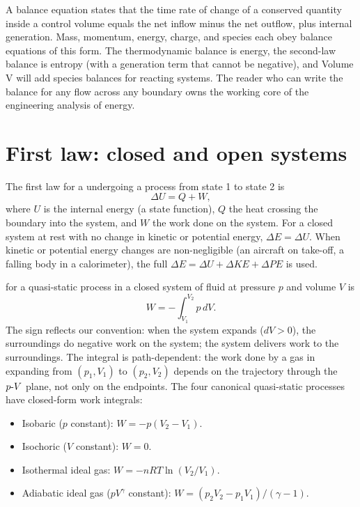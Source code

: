 \begin{archetype}[Balance]
A balance equation states that the time rate of change of a conserved
quantity inside a control volume equals the net inflow minus the net
outflow, plus internal generation. Mass, momentum, energy, charge, and
species each obey balance equations of this form. The thermodynamic
balance is energy, the second-law balance is entropy (with a
generation term that cannot be negative), and Volume V will add
species balances for reacting systems. The reader who can write the
balance for any flow across any boundary owns the working core of the
engineering analysis of energy.
\end{archetype}

\section{First law: closed and open systems}

The first law for a  undergoing a process from
state 1 to state 2 is
\[
\Delta U = Q + W,
\]
where $U$ is the internal energy (a state function), $Q$ the heat
crossing the boundary into the system, and $W$ the work done on the
system. For a closed system at rest with no change in kinetic or
potential energy, $\Delta E = \Delta U$. When kinetic or potential
energy changes are non-negligible (an aircraft on take-off, a falling
body in a calorimeter), the full $\Delta E = \Delta U + \Delta KE +
\Delta PE$ is used.

 for a quasi-static process in a closed system
of fluid at pressure $p$ and volume $V$ is
\[
W = -\int_{V_1}^{V_2} p \,dV.
\]
The sign reflects our convention: when the system expands ($dV > 0$),
the surroundings do negative work on the system; the system delivers
work to the surroundings. The integral is path-dependent: the work
done by a gas in expanding from $(p_1, V_1)$ to $(p_2, V_2)$ depends
on the trajectory through the $p\textnormal{-}V$ plane, not only on
the endpoints. The four canonical quasi-static processes have
closed-form work integrals:

\begin{itemize}[leftmargin=*]
  \item Isobaric ($p$ constant): $W = -p (V_2 - V_1)$.
  \item Isochoric ($V$ constant): $W = 0$.
  \item Isothermal ideal gas: $W = -nRT \ln(V_2/V_1)$.
  \item Adiabatic ideal gas ($pV^\gamma$ constant): $W = (p_2 V_2 -
    p_1 V_1)/(\gamma - 1)$.
\end{itemize}

